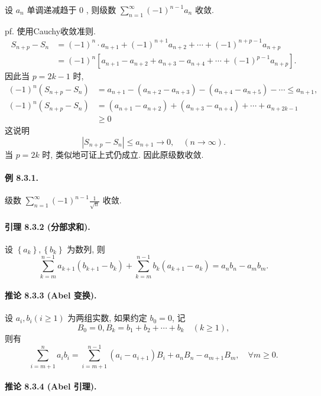 设 $a_{n}$ 单调递减趋于 0 , 则级数 $\sum_{n=1}^{\infty}(-1)^{n-1}a_{n}$ 收敛.

pf. 使用Cauchy收敛准则.
\[
\begin{aligned}S_{n+p}-S_{n} & =(-1)^{n}\cdot a_{n+1}+(-1)^{n+1}a_{n+2}+\cdots+(-1)^{n+p-1}a_{n+p}\\
	& =(-1)^{n}\left[a_{n+1}-a_{n+2}+a_{n+3}-a_{n+4}+\cdots+(-1)^{p-1}a_{n+p}\right].
\end{aligned}
\]
因此当 $p=2k-1$ 时, 
\[
\begin{aligned}(-1)^{n}\left(S_{n+p}-S_{n}\right) & =a_{n+1}-\left(a_{n+2}-a_{n+3}\right)-\left(a_{n+4}-a_{n+5}\right)-\cdots\leqslant a_{n+1},\\
	(-1)^{n}\left(S_{n+p}-S_{n}\right) & =\left(a_{n+1}-a_{n+2}\right)+\left(a_{n+3}-a_{n+4}\right)+\cdots+a_{n+2k-1}\\
	& \geqslant0
\end{aligned}
\]
这说明 
\[
\left|S_{n+p}-S_{n}\right|\leqslant a_{n+1}\rightarrow0,\quad(n\rightarrow\infty).
\]
当 $p=2k$ 时, 类似地可证上式仍成立. 因此原级数收敛.

\paragraph{例 8.3.1. }

级数 $\sum_{n=1}^{\infty}(-1)^{n-1}\frac{1}{\sqrt{n}}$ 收敛.

\paragraph{引理 8.3.2 (分部求和). }

设 $\left\{ a_{k}\right\} ,\left\{ b_{k}\right\} $ 为数列, 则 
\[
\sum_{k=m}^{n-1}a_{k+1}\left(b_{k+1}-b_{k}\right)+\sum_{k=m}^{n-1}b_{k}\left(a_{k+1}-a_{k}\right)=a_{n}b_{n}-a_{m}b_{m}.
\]


\paragraph{推论 8.3.3 (Abel 变换). }

设 $a_{i},b_{i}(i\geqslant1)$ 为两组实数, 如果约定 $b_{0}=0$, 记 
\[
B_{0}=0,B_{k}=b_{1}+b_{2}+\cdots+b_{k}\quad(k\geqslant1),
\]
则有 
\[
\sum_{i=m+1}^{n}a_{i}b_{i}=\sum_{i=m+1}^{n-1}\left(a_{i}-a_{i+1}\right)B_{i}+a_{n}B_{n}-a_{m+1}B_{m},\quad\forall m\geqslant0.
\]


\paragraph{推论 8.3.4 (Abel 引理). }

